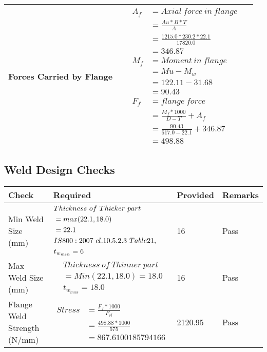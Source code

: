 \documentclass{article}%
\begin{document}
\begin{longtable}{|p{4cm}|p{5cm}|p{5.5cm}|p{1.5cm}|}
\hline%
Forces Carried by Flange&&$\begin{aligned} A_f&= Axial~force~ in ~flange  \\ &= \frac{Au * B *T}{A} \\ &= \frac{1215.0 * 230.2*22.1}{17820.0} \\ &=346.87\\ M_f& =Moment~ in~ flange \\  & = Mu-M_w\\ &= 122.11-31.68\\ &=90.43\\  F_f& =flange~force  \\ & = \frac{M_f *1000}{D-T} + A_f \\ &= \frac{90.43}{617.0-22.1} +346.87 \\ &=498.88\end{aligned}$&\\%
\hline%
\end{longtable}

%
\newpage%
\subsection{Weld Design Checks}%
\label{subsec:WeldDesignChecks}%
\renewcommand{\arraystretch}{1.2}%
\begin{longtable}{|p{4cm}|p{5cm}|p{5.5cm}|p{1.5cm}|}%
\hline%
\rowcolor{OsdagGreen}%
Check&Required&Provided&Remarks\\%
\hline%
\endhead%
\hline%
Min Weld Size (mm)&$\begin{aligned} &Thickness~of~Thicker~part\\ \noindent &=max(22.1,18.0)\\ &=22.1\\ &IS800:2007~cl.10.5.2.3~Table 21,\\  &t_{w_{min}}=6\end{aligned}$&16&Pass\\%
\hline%
Max Weld Size (mm)&$\begin{aligned} & Thickness~of~Thinner~part\\ &=Min(22.1,18.0)=18.0\\ &t_{w_{max}} =18.0\end{aligned}$&16&Pass\\%
\hline%
Flange Weld Strength (N/mm)&$\begin{aligned} Stress &= \frac{F_f*1000}{F_{rl}}\\  &= \frac{498.88*1000}{575}\\ &= 867.6100185794166\end{aligned}$&2120.95&Pass\\%
\hline%
\end{longtable}
\end{document}
